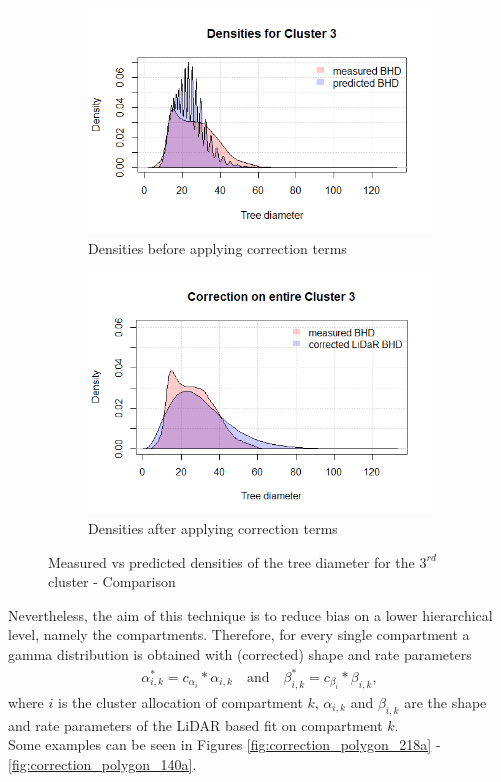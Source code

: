 \begin{figure}[H]
\centering
\begin{subfigure}{.5\textwidth}
  \centering
  \includegraphics[width=.9\linewidth]{dens3.png}
  \caption{Densities before applying correction terms}
  \label{fig:dens3}
\end{subfigure}%
\begin{subfigure}{.5\textwidth}
  \centering
  \includegraphics[width=0.842\linewidth]{correction_entire_cluster3.png}
  \caption{Densities after applying correction terms}
  \label{fig:cluster3_pred}
\end{subfigure}
\caption{Measured vs predicted densities of the tree diameter for the $3^{rd}$ cluster - Comparison}
\label{fig:cluster3_entire_corrected}
\end{figure}

Nevertheless, the aim of this technique is to reduce bias on a lower hierarchical level, namely the compartments. Therefore, for every single compartment a gamma distribution is obtained with (corrected) shape and rate parameters 
\begin{align*}
\alpha_{i,k}^* = c_{\alpha_i} * \alpha_{i,k} \quad \text{and} \quad \beta_{i,k}^* = c_{\beta_i} * \beta_{i,k},
\end{align*}
 where $i$ is the cluster allocation of compartment $k$, $\alpha_{i,k}$ and $\beta_{i,k}$ are the shape and rate parameters of the LiDAR based fit on compartment $k$.\\
  Some examples can be seen in Figures \ref{fig:correction_polygon_218a} - \ref{fig:correction_polygon_140a}.

